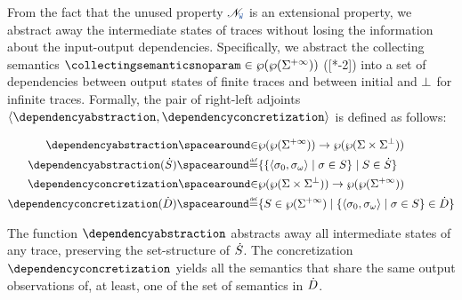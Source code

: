 From the fact that the unused property $\unused$ is an extensional property, we abstract away the intermediate states of traces without losing the information about the input-output dependencies.
Specifically, we abstract the collecting semantics $\collectingsemanticsnoparam\in\collectingtype$ ([*-2]) into a set of dependencies between output states of finite traces and between initial and $\bot$ for infinite traces.
Formally, the pair of right-left adjoints $\tuple{\dependencyabstraction}{\dependencyconcretization}$ is defined as follows:
\begin{definition}
\begin{align*}
  \dependencyabstraction \IN& \collectingtype \to \dependencytype \\
  \dependencyabstraction(\defsetofsetoftraces) \DefeQ& \setdef{
    \setdef{\inputoutputtuple{\defseq}}{\defseq\in\defsetoftraces}
  }{
    \defsetoftraces\in\defsetofsetoftraces
  }\\
  \dependencyconcretization \IN& \dependencytype \to \collectingtype \\
  \dependencyconcretization(\defsetofsetofdependencies) \DefeQ& \setdef{
    \defsetoftraces\in\setof\finiteinfinitesequences
  }{
    \setdef{\inputoutputtuple\defseq}{\defseq\in\defsetoftraces} \in \defsetofsetofdependencies
  }
\end{align*}
\end{definition}
The function $\dependencyabstraction$ abstracts away all intermediate states of any trace, preserving the set-structure of $\dot{S}$.
The concretization $\dependencyconcretization$ yields all the semantics that share the same output observations of, at least, one of the set of semantics in $\dot{D}$.


